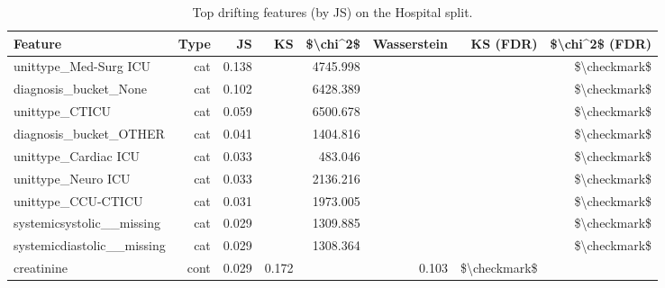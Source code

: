 \begin{table}
\caption{Top drifting features (by JS) on the Hospital split.}
\label{tab:topdrifting-hospital}
\begin{tabular}{lrrrrrrr}
\toprule
Feature & Type & JS & KS & \$\textbackslash chi\textasciicircum 2\$ & Wasserstein & KS (FDR) & \$\textbackslash chi\textasciicircum 2\$ (FDR) \\
\midrule
unittype\_Med-Surg ICU & cat & 0.138 &  & 4745.998 &  &  & \$\textbackslash checkmark\$ \\
diagnosis\_bucket\_None & cat & 0.102 &  & 6428.389 &  &  & \$\textbackslash checkmark\$ \\
unittype\_CTICU & cat & 0.059 &  & 6500.678 &  &  & \$\textbackslash checkmark\$ \\
diagnosis\_bucket\_OTHER & cat & 0.041 &  & 1404.816 &  &  & \$\textbackslash checkmark\$ \\
unittype\_Cardiac ICU & cat & 0.033 &  & 483.046 &  &  & \$\textbackslash checkmark\$ \\
unittype\_Neuro ICU & cat & 0.033 &  & 2136.216 &  &  & \$\textbackslash checkmark\$ \\
unittype\_CCU-CTICU & cat & 0.031 &  & 1973.005 &  &  & \$\textbackslash checkmark\$ \\
systemicsystolic\_\_missing & cat & 0.029 &  & 1309.885 &  &  & \$\textbackslash checkmark\$ \\
systemicdiastolic\_\_missing & cat & 0.029 &  & 1308.364 &  &  & \$\textbackslash checkmark\$ \\
creatinine & cont & 0.029 & 0.172 &  & 0.103 & \$\textbackslash checkmark\$ &  \\
\bottomrule
\end{tabular}
\end{table}

